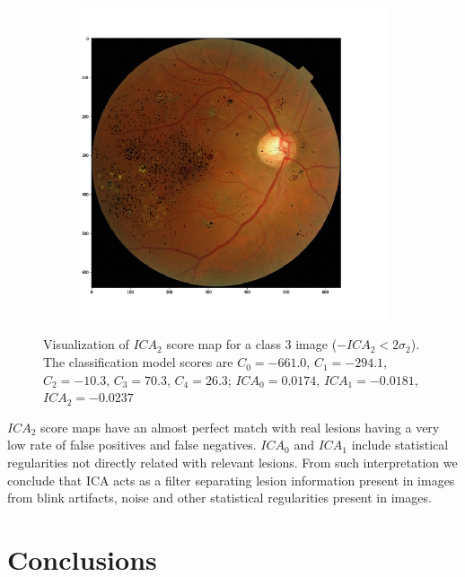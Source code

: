 \documentclass[preprint]{elsarticle}
\theoremstyle{definition} %
\theoremstyle{remark}
\begin{document}
\begin{figure}[h!]
	\centering
	\begin{subfigure}[b]{\textwidth}
		\centering
		\includegraphics[width=\textwidth]{figures/c3/retina_mICA2.png}
	\end{subfigure}
	\caption{Visualization of $ICA_2$ score map for a class 3 image ($-ICA_2 < 2 \sigma_2$). The classification model scores are $C_0 = -661.0$, $C_1 = -294.1$,  $C_2 = -10.3$,   $C_3 = 70.3$,   $C_4 = 26.3$; $ICA_0 = 0.0174$, $ICA_1 = -0.0181$, $ICA_2 = -0.0237$}  
	\label{fig:ica_components_c3} 
\end{figure}

$ICA_2$ score maps have an almost perfect match with real lesions having a very low rate of false positives and false negatives. $ICA_0$ and $ICA_1$ include statistical regularities not directly related with relevant lesions. From such interpretation we conclude that ICA acts as a filter separating lesion information present in images from blink artifacts, noise and other statistical regularities present in images.

\section{Conclusions}\label{sec:conclusions}
\end{document}
